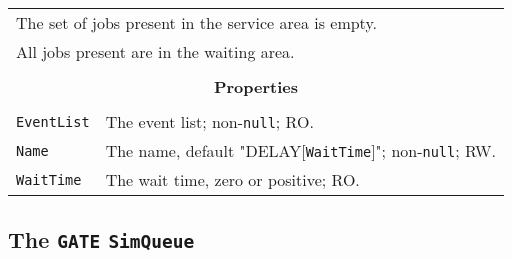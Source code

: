 \documentclass[12pt]{book}
\begin{document}
\begin{tabular}{|l|l|l|}
\hline
\multicolumn{3}{|l|}{The set of jobs present in the service area is empty.} \\
\multicolumn{3}{|l|}{All jobs present are in the waiting area.} \\
\hline
\multicolumn{3}{|c|}{} \\
\multicolumn{3}{|c|}{\bf Properties} \\
\multicolumn{3}{|c|}{} \\
\hline
\lstinline|EventList| & \multicolumn{2}{|l|}{The event list; non-\lstinline|null|; RO.} \\
\hline
\lstinline|Name|      & \multicolumn{2}{|l|}{The name, default "DELAY[\lstinline|WaitTime|]";
                                             non-\lstinline|null|; RW.} \\
\hline
\lstinline|WaitTime|  & \multicolumn{2}{|l|}{The wait time, zero or positive; RO.} \\
\hline
\end{tabular}

\subsection{The \lstinline{GATE} \lstinline{SimQueue}}
\end{document}
